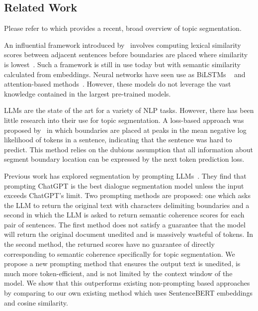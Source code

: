 \subsection{Related Work}

Please refer to \citep{XingThesis} which provides a recent, broad overview of topic segmentation.

An influential framework introduced by~\citep{TextTiling} involves computing lexical similarity scores between adjacent sentences before boundaries are placed where similarity is lowest~\citep{lexical1,lexical2}. Such a framework is still in use today but with semantic similarity calculated from embeddings. Neural networks have seen use as BiLSTMs ~\citep{BiLSTM,HierarchicalBiLSTM,CNNFeaturesLSTMAttention} and attention-based methods~\cite{CrossAttentionHierarchical,TwoLevelTransformerSoftmax,TwoLevelTransformerPretrained}. However, these models do not leverage the vast knowledge contained in the largest pre-trained models.

LLMs are the state of the art for a variety of NLP tasks. However, there has been little research into their use for topic segmentation. A loss-based approach was proposed by~\citep{DialoGPT} in which boundaries are placed at peaks in the mean negative log likelihood of tokens in a sentence, indicating that the sentence was hard to predict. This method relies on the dubious assumption that all information about segment boundary location can be expressed by the next token prediction loss.

Previous work has explored segmentation by prompting LLMs~\citep{XingThesis}. They find that prompting ChatGPT is the best dialogue segmentation model unless the input exceeds ChatGPT's limit. Two prompting methods are proposed: one which asks the LLM to return the original text with characters delimiting boundaries and a second in which the LLM is asked to return semantic coherence scores for each pair of sentences. The first method does not satisfy a guarantee that the model will return the original document unedited and is massively wasteful of tokens. In the second method, the returned scores have no guarantee of directly corresponding to semantic coherence specifically for topic segmentation. We propose a new prompting method that ensures the output text is unedited, is much more token-efficient, and is not limited by the context window of the model. We show that this outperforms existing non-prompting based approaches by comparing to our own existing method which uses SentenceBERT embeddings and cosine similarity.

